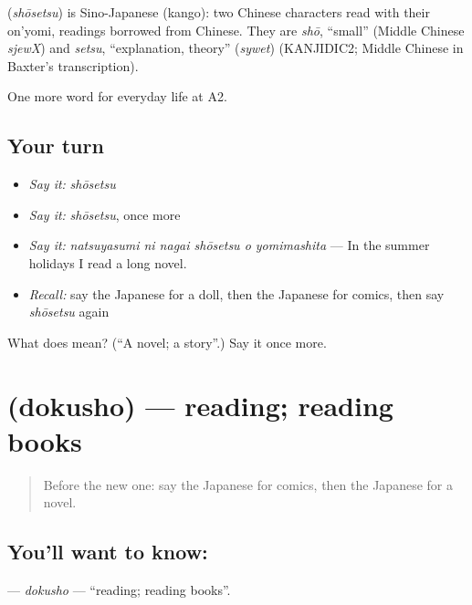 \begin{cousinweb}
\textbf{} (\emph{shōsetsu}) is Sino-Japanese (kango): two Chinese characters read with their on'yomi, readings borrowed from Chinese. They are \emph{shō}, \textquotedblleft{}small\textquotedblright{} (Middle Chinese \emph{sjewX}) and \emph{setsu}, \textquotedblleft{}explanation, theory\textquotedblright{} (\emph{sywet}) (KANJIDIC2; Middle Chinese in Baxter's transcription).
\end{cousinweb}

\begin{grammarlens}[title={What you've built}]
One more word for everyday life at A2.
\end{grammarlens}

\subsection*{Your turn}
\begin{itemize}
\raggedright
  \item \emph{Say it:} \emph{shōsetsu}
  \item \emph{Say it:} \emph{shōsetsu}, once more
  \item \emph{Say it:} \emph{natsuyasumi ni nagai shōsetsu o yomimashita} — In the summer holidays I read a long novel.
  \item \emph{Recall:} say the Japanese for a doll, then the Japanese for comics, then say \emph{shōsetsu} again
\end{itemize}

\begin{tcolorbox}[breakable,colback=teal!4,colframe=teal!35!black,title={Before you move on}]
What does  mean? (\textquotedblleft{}A novel; a story\textquotedblright{}.) Say it once more.
\end{tcolorbox}
\section[\texorpdfstring{\ja{どくしょ} (dokusho)}{どくしょ (dokusho)}]{ (dokusho) — reading; reading books}

\label{lesson:JA-C238-dokusho}



\begin{quote}
Before the new one: say the Japanese for comics, then the Japanese for a novel.
\end{quote}

\subsection*{You'll want to know: }
\textbf{} — \emph{dokusho} — \textquotedblleft{}reading; reading books\textquotedblright{}.

